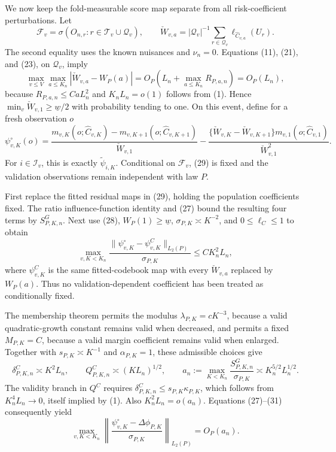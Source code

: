 We now keep the fold-measurable score map separate from all risk-coefficient perturbations.  Let
\[
 \mathcal F_v=\sigma(O_{n,r}:r\in\mathcal T_v\cup\mathcal Q_v),
 \qquad
 \check W_{v,a}=|\mathcal Q_v|^{-1}\sum_{r\in\mathcal Q_v}
 \ell_{\widehat C_{v,a}}(U_r).
\]
The second equality uses the known nuisances and \(\nu_n=0\).  Equations (11), (21), and (23), on \(\mathcal Q_v\), imply
\[
 \max_{v\leq V}\max_{a\leq K_n}|\check W_{v,a}-W_P(a)|
 =O_P\!\left(L_n+\max_{a\leq K_n}R_{P,a,n}\right)=O_P(L_n),                 \tag{28}
\]
because \(R_{P,a,n}\leq CaL_n^2\) and \(K_nL_n=o(1)\) follows from (1).  Hence \(\min_v\check W_{v,1}\geq\underline w/2\) with probability tending to one.  On this event, define for a fresh observation \(o\)
\[
 \psi_{v,K}^{\circ}(o)=
 \frac{m_{v,K}(o;\widehat C_{v,K})-m_{v,K+1}(o;\widehat C_{v,K+1})}{\check W_{v,1}}
 -\frac{\{\check W_{v,K}-\check W_{v,K+1}\}m_{v,1}(o;\widehat C_{v,1})}
 {\check W_{v,1}^2}.                                                         \tag{29}
\]
For \(i\in\mathcal I_v\), this is exactly \(\widetilde\psi_{i,K}\).  Conditional on \(\mathcal F_v\), (29) is fixed and the validation observations remain independent with law \(P\).

First replace the fitted residual maps in (29), holding the population coefficients fixed.  The ratio influence-function identity and (27) bound the resulting four terms by \(S^G_{P,K,n}\).  Next use (28), \(W_P(1)\geq\underline w\), \(\sigma_{P,K}\asymp K^{-2}\), and \(0\leq\ell_C\leq1\) to obtain
\[
 \max_{v,K<K_n}\frac{\|\psi_{v,K}^{\circ}-\psi_{v,K}^{C}\|_{L_2(P)}}{\sigma_{P,K}}
 \leq CK_n^2L_n,                                                            \tag{30}
\]
where \(\psi_{v,K}^{C}\) is the same fitted-codebook map with every \(\check W_{v,a}\) replaced by \(W_P(a)\).  Thus no validation-dependent coefficient has been treated as conditionally fixed.

The membership theorem permits the modulus \(\lambda_{P,K}=cK^{-3}\), because a valid quadratic-growth constant remains valid when decreased, and permits a fixed \(M_{P,K}=C\), because a valid margin coefficient remains valid when enlarged.  Together with \(s_{P,K}\asymp K^{-1}\) and \(\alpha_{P,K}=1\), these admissible choices give
\[
 \delta^C_{P,K,n}\asymp K^2L_n,\qquad
 Q^C_{P,K,n}\asymp(KL_n)^{1/2},\qquad
 a_n:=\max_{K<K_n}\frac{S^G_{P,K,n}}{\sigma_{P,K}}
 \asymp K_n^{5/2}L_n^{1/2}.                                                 \tag{31}
\]
The validity branch in \(Q^C\) requires \(\delta^C_{P,K,n}\leq s_{P,K}\kappa_{P,K}\), which follows from \(K_n^4L_n\to0\), itself implied by (1).  Also \(K_n^2L_n=o(a_n)\).  Equations (27)--(31) consequently yield
\[
 \max_{v,K<K_n}\left\|
 \frac{\psi_{v,K}^{\circ}-\Delta\phi_{P,K}}{\sigma_{P,K}}
 \right\|_{L_2(P)}=O_P(a_n).                                                \tag{32}
\]

